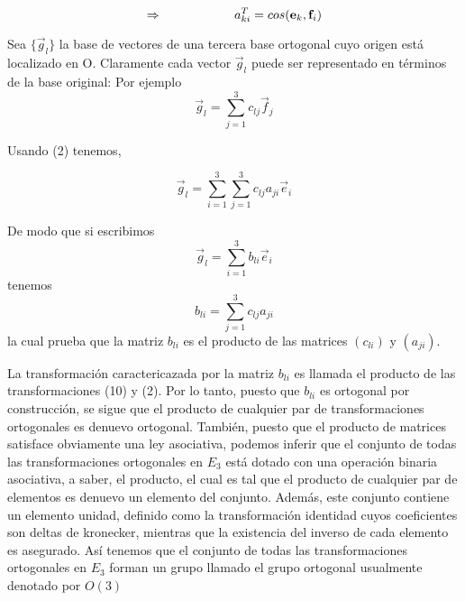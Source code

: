\begin{equation}
  \Rightarrow \hspace{2 cm}a^T_{ki}=cos(\vec{e_k},\vec{f_i})
  \label{eq:eq_7}
\end{equation}

Sea $\{\vec{g}_l\}$ la base de vectores de una tercera base ortogonal cuyo origen está localizado en O. Claramente cada vector $\vec{g}_l$ puede ser representado en términos de la base original:
Por ejemplo
\begin{equation}
  \vec{g}_l=\sum^{3}_{j=1}c_{lj}\vec{f}_{j}
\end{equation}

Usando (2) tenemos,

\begin{equation}
  \vec{g}_l=\sum^{3}_{i=1}\sum^{3}_{j=1}c_{lj}a_{ji}\vec{e}_{i}
  \label{eq:eq_11}
\end{equation}

De modo que si escribimos
\begin{equation}
  \vec{g}_l=\sum^{3}_{i=1}b_{li}\vec{e}_{i}
  \label{eq:eq_12}  
\end{equation}
tenemos
\begin{equation}
  b_{li}=\sum^{3}_{j=1}c_{lj}a_{ji}
  \label{eq:eq_13}
\end{equation}
la cual prueba que la matriz $b_{li}$ es el producto de las matrices $(c_{li})$ y $(a_{ji})$.

La transformación caractericazada por la matriz $b_{li}$ es llamada el producto de las transformaciones (10) y (2). Por lo tanto, puesto que $b_{li}$ es ortogonal por construcción, se sigue que el producto de cualquier par de transformaciones ortogonales es denuevo ortogonal. También, puesto que el producto de matrices satisface obviamente una ley asociativa, podemos inferir que el conjunto de todas las transformaciones ortogonales en $E_3$ está dotado con una operación binaria asociativa, a saber, el producto, el cual es tal que el producto de cualquier par de elementos es denuevo un elemento del conjunto. Además, este conjunto contiene un elemento unidad, definido como la transformación identidad cuyos coeficientes son deltas de kronecker, mientras que la existencia del inverso de cada elemento es asegurado. Así tenemos que el conjunto de todas las transformaciones ortogonales en $E_3$  forman un grupo llamado el grupo ortogonal usualmente denotado por $O(3)$